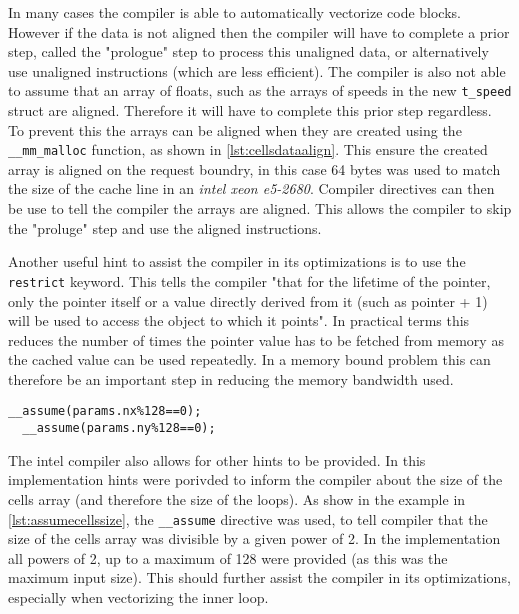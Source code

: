 \documentclass{article}
\begin{document}
\begin{multicols}{2}
In many cases the compiler is able to automatically vectorize code blocks.
However if the data is not aligned then the compiler will have to complete a prior
step, called the "prologue" step to process this unaligned data, or
alternatively use unaligned instructions (which are less efficient). The
compiler is also not able to assume that an array of floats, such as the arrays
of speeds in the new \verb|t_speed| struct are aligned. Therefore it will have
to complete this prior step regardless. To prevent this the arrays can be
aligned when they are created using the \verb|__mm_malloc| function, as shown in \autoref{lst:cellsdataalign}. This
ensure the created array is aligned on the request boundry, in this case 64
bytes was used to match the size of the cache line in an \emph{intel xeon
e5-2680}. Compiler directives can then be use to tell the compiler the arrays
are aligned. This allows the compiler to skip the "proluge" step and use the
aligned instructions.


Another useful hint to assist the compiler in its optimizations is to use the
\verb|restrict| keyword. This tells the compiler "that for the lifetime of the
pointer, only the pointer itself or a value directly derived from it (such as
pointer + 1) will be used to access the object to which it points". In
practical terms this reduces the number of times the pointer value has to be
fetched from memory as the cached value can be used repeatedly. In a memory
bound problem this can therefore be an important step in reducing the memory
bandwidth used.

\begin{lstlisting}[style=CStyle, label={lst:assumecellssize}, caption={Additional compiler hints},]
  __assume(params.nx%128==0);
  __assume(params.ny%128==0);
\end{lstlisting}

The intel compiler also allows for other hints to be provided. In this
implementation hints were porivded to inform the compiler about the size of the
cells array (and therefore the size of the loops). As show in the example in
\autoref{lst:assumecellssize}, the \verb|__assume| directive was used, to tell
compiler that the size of the cells array was divisible by a given power of 2.
In the implementation all powers of 2, up to a maximum of 128 were provided (as
this was the maximum input size). This should further assist the compiler in
its optimizations, especially when vectorizing the inner loop.


\end{multicols}
\end{document}
